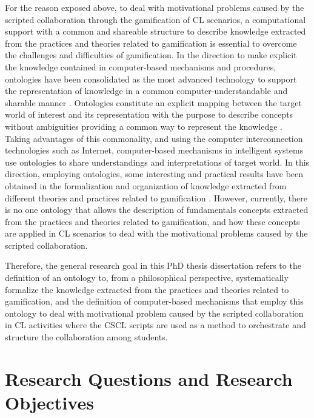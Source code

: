 For the reason exposed above, to deal with motivational problems caused by the scripted collaboration through the gamification of CL scenarios, a computational support with a common and shareable structure to describe knowledge extracted from the practices and theories related to gamification is essential to overcome the challenges and difficulties of gamification. In the direction to make explicit the knowledge contained in computer-based mechanisms and procedures, ontologies have been consolidated as the most advanced technology to support the representation of knowledge in a common computer-understandable and sharable manner \cite{AsikriLaassiriKritChaib2016, Devedzic2006, MizoguchiBourdeau2016}. Ontologies constitute an explicit mapping between the target world of interest and its representation with the purpose to describe concepts without ambiguities providing a common way to represent the knowledge \cite{GuarinoOberleStaab2009}. Taking advantages of this commonality, and using the computer interconnection technologies such as Internet, computer-based mechanisms in intelligent systems use ontologies to share understandings and interpretations of target world. In this direction, employing ontologies, some interesting and practical results have been obtained in the formalization and organization of knowledge extracted from different theories and practices related to gamification \cite{DermevalVilelaBittencourtCastroIsotaniBritoSilva2016, KarkarAlJa'amFoufou2016, ZouaqNkambou2010}. However, currently, there is no one ontology that allows the description of fundamentals concepts extracted from the practices and theories related to gamification, and how these concepts are applied in CL scenarios to deal with the motivational problems caused by the scripted collaboration.

Therefore, the general research goal in this PhD thesis dissertation refers to the definition of an ontology to, from a philosophical perspective, systematically formalize the knowledge extracted from the practices and theories related to gamification, and the definition of computer-based mechanisms that employ this ontology to deal with motivational problem caused by the scripted collaboration in CL activities where the CSCL scripts are used as a method to orchestrate and structure the collaboration among students.

\section{Research Questions and Research Objectives}
\label{sec:research-question-and-research-objectives}

